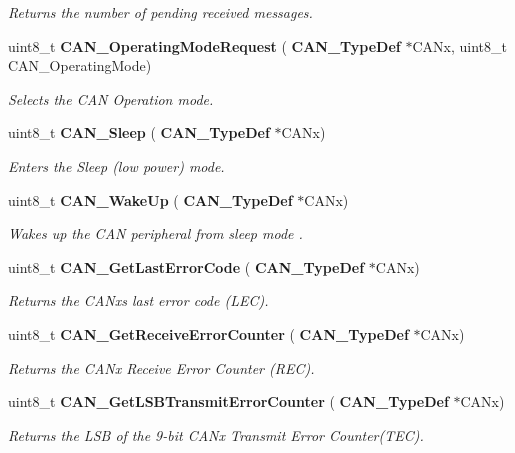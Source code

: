\begin{DoxyCompactItemize}
\begin{DoxyCompactList}\small\item\em Returns the number of pending received messages. \end{DoxyCompactList}\item 
uint8\+\_\+t \textbf{ C\+A\+N\+\_\+\+Operating\+Mode\+Request} (\textbf{ C\+A\+N\+\_\+\+Type\+Def} $\ast$C\+A\+Nx, uint8\+\_\+t C\+A\+N\+\_\+\+Operating\+Mode)
\begin{DoxyCompactList}\small\item\em Selects the C\+AN Operation mode. \end{DoxyCompactList}\item 
uint8\+\_\+t \textbf{ C\+A\+N\+\_\+\+Sleep} (\textbf{ C\+A\+N\+\_\+\+Type\+Def} $\ast$C\+A\+Nx)
\begin{DoxyCompactList}\small\item\em Enters the Sleep (low power) mode. \end{DoxyCompactList}\item 
uint8\+\_\+t \textbf{ C\+A\+N\+\_\+\+Wake\+Up} (\textbf{ C\+A\+N\+\_\+\+Type\+Def} $\ast$C\+A\+Nx)
\begin{DoxyCompactList}\small\item\em Wakes up the C\+AN peripheral from sleep mode . \end{DoxyCompactList}\item 
uint8\+\_\+t \textbf{ C\+A\+N\+\_\+\+Get\+Last\+Error\+Code} (\textbf{ C\+A\+N\+\_\+\+Type\+Def} $\ast$C\+A\+Nx)
\begin{DoxyCompactList}\small\item\em Returns the C\+A\+Nx\textquotesingle{}s last error code (L\+EC). \end{DoxyCompactList}\item 
uint8\+\_\+t \textbf{ C\+A\+N\+\_\+\+Get\+Receive\+Error\+Counter} (\textbf{ C\+A\+N\+\_\+\+Type\+Def} $\ast$C\+A\+Nx)
\begin{DoxyCompactList}\small\item\em Returns the C\+A\+Nx Receive Error Counter (R\+EC). \end{DoxyCompactList}\item 
uint8\+\_\+t \textbf{ C\+A\+N\+\_\+\+Get\+L\+S\+B\+Transmit\+Error\+Counter} (\textbf{ C\+A\+N\+\_\+\+Type\+Def} $\ast$C\+A\+Nx)
\begin{DoxyCompactList}\small\item\em Returns the L\+SB of the 9-\/bit C\+A\+Nx Transmit Error Counter(\+T\+E\+C). \end{DoxyCompactList}\item 

\end{DoxyCompactItemize}
